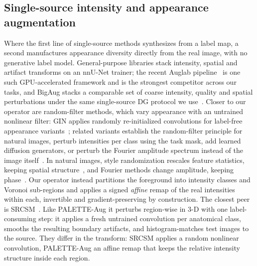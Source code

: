 \subsection{Single-source intensity and appearance augmentation}
\label{subsec:aug}

Where the first line of single-source methods synthesizes from a label map, a
second manufactures appearance diversity directly from the real image, with
no generative label model. General-purpose libraries stack intensity,
spatial and artifact transforms on an nnU-Net trainer; the recent Auglab
pipeline~\cite{molinier2026auglab,isensee2021nnunet} is one such
GPU-accelerated framework and is the strongest competitor across our tasks,
and BigAug stacks a comparable set of coarse intensity, quality
and spatial perturbations under the same single-source DG protocol we
use~\cite{zhang2020bigaug}. Closer to our operator are
random-filter methods, which vary appearance with an untrained nonlinear
filter: GIN applies randomly re-initialized convolutions for label-free
appearance variants~\cite{ouyang2022gin}; related variants establish the random-filter principle for
natural images, perturb intensities per class using the task mask, add
learned diffusion generators, or perturb the Fourier amplitude spectrum
instead of the image
itself~\cite{xu2021randconv,su2023slaug,chen2024diffusionsdg,zhao2024morestyle,li2024raffesdg,qiao2024ras}.
In natural images, style randomization rescales feature statistics, keeping
spatial structure~\cite{huang2017adain,zhou2021mixstyle,li2022dsu}, and Fourier
methods change amplitude, keeping phase~\cite{xu2021fact}.
Our operator
instead partitions the foreground into intensity classes and Voronoi
sub-regions and applies a signed \emph{affine} remap of the real intensities
within each, invertible and gradient-preserving by construction. The
closest peer is SRCSM~\cite{thaler2025semrandconv}. Like PALETTE-Aug it
perturbs region-wise in 3-D with one label-consuming step: it applies a fresh
untrained convolution per anatomical class, smooths the resulting boundary
artifacts, and histogram-matches test images to the source. They differ in the transform: SRCSM applies a random nonlinear convolution,
PALETTE-Aug an affine remap that keeps the relative intensity structure inside
each region.
